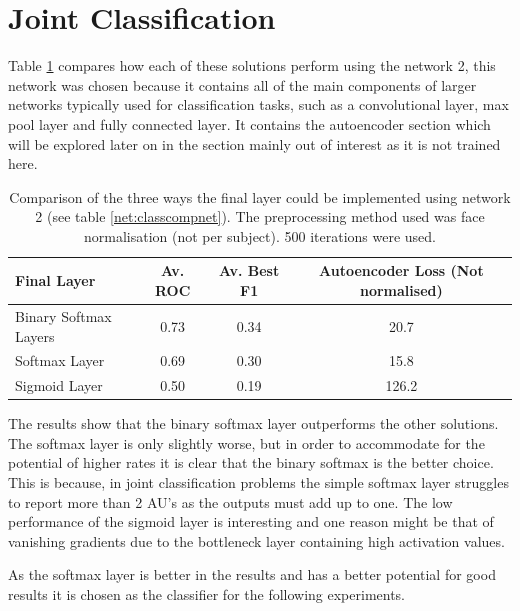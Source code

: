   \section{Joint Classification}
    Table \ref{tab:binsoftcomp} compares how each of these solutions perform using the network 2, this network was chosen because it contains all of the main
    components of larger networks typically used for classification tasks, such as a convolutional
    layer, max pool layer and fully connected layer. It contains the autoencoder section which will be
    explored later on in the section mainly out of interest as it is not trained here.

    \begin{table}[!h] {\footnotesize
        \centering
        \begin{tabular}{lccc}
        \hline
        Final Layer   & Av. ROC &   Av. Best F1 &   Autoencoder Loss (Not normalised) \\
        \hline
        Binary Softmax Layers  &   0.73 &  0.34 &   20.7 \\
        Softmax Layer          &   0.69 &  0.30 &   15.8 \\
        Sigmoid Layer          &   0.50 &  0.19 &  126.2 \\
        \hline
        \end{tabular}
      \caption{Comparison of the three ways the final layer could be implemented using network 2 (see table \ref{net:classcompnet}). The
      preprocessing method used was face normalisation (not per subject). 500 iterations were used. } \label{tab:binsoftcomp} }
      \end{table}

      The results show that the binary softmax layer outperforms the other solutions. The
      softmax layer is only slightly worse, but in order to accommodate for the potential of higher rates
      it is clear that the binary softmax is the better choice. This is because, in joint classification problems
      the simple softmax layer struggles to report more than 2 AU's as the outputs must add up to one.
      The low performance of the sigmoid layer is interesting and one reason might be that of vanishing gradients due to
      the bottleneck layer containing high activation values.

      As the softmax layer is better in the results and has a better potential for good results
      it is chosen as the classifier for the following experiments.

